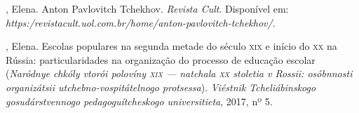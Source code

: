 \begin{bibliohedra}
, Elena. Anton Pavlovitch Tchekhov. \textit{Revista Cult}. Disponível em:
\textit{https:/revistacult.uol.com.br/home/anton-pavlovitch-tchekhov/}.

, Elena. Escolas populares na segunda metade do século \textsc{xix} e início do \textsc{xx} na Rússia: particularidades na organização do processo de educação escolar (\textit{Naródnye chkóly vtorói polovíny \textsc{xix} — natchala \textsc{xx} stoletia v Rossii: osóbnnosti organizátsii utchebno-vospitátelnogo protsessa}). \textit{Viéstnik Tcheliábinskogo gosudárstvennogo pedagoguítcheskogo universitieta}, 2017, nº 5.
\end{bibliohedra}


\endgroup
\pagebreak
